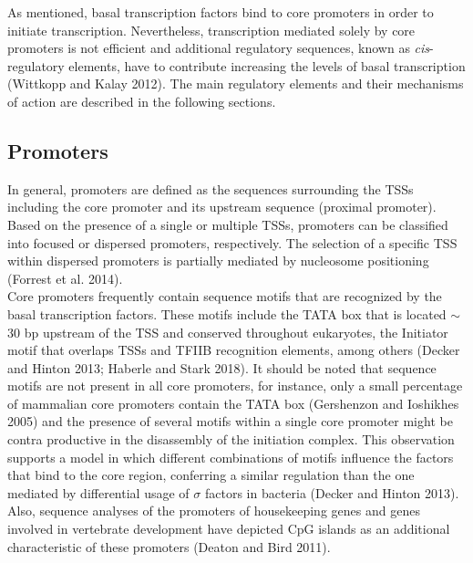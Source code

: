 As mentioned, basal transcription factors bind to core promoters in order to initiate transcription. Nevertheless, transcription mediated solely by core promoters is not efficient and additional regulatory sequences, known as \textit{cis}-regulatory elements, have to contribute increasing the levels of basal transcription (Wittkopp and Kalay 2012). The main regulatory elements and their mechanisms of action are described in the following sections.\\

		\subsection{Promoters}

In general, promoters are defined as the sequences surrounding the TSSs including the core promoter and its upstream sequence (proximal promoter). Based on the presence of a single or multiple TSSs, promoters can be classified into focused or dispersed promoters, respectively. The selection of a specific TSS within dispersed promoters is partially mediated by nucleosome positioning (Forrest et al. 2014).\\

Core promoters frequently contain sequence motifs that are recognized by the basal transcription factors. These motifs include the TATA box that is located $\sim$30 bp upstream of the TSS and conserved throughout eukaryotes, the Initiator motif that overlaps TSSs and TFIIB recognition elements, among others (Decker and Hinton 2013; Haberle and Stark 2018). It should be noted that sequence motifs are not present in all core promoters, for instance, only a small percentage of mammalian core promoters contain the TATA box (Gershenzon and Ioshikhes 2005) and the presence of several motifs within a single core promoter might be contra productive in the disassembly of the initiation complex. This observation supports a model in which different combinations of motifs influence the factors that bind to the core region, conferring a similar regulation than the one mediated by differential usage of $\sigma$ factors in bacteria (Decker and Hinton 2013). Also, sequence analyses of the promoters of housekeeping genes and genes involved in vertebrate development have depicted CpG islands as an additional characteristic of these promoters (Deaton and Bird 2011).\\

